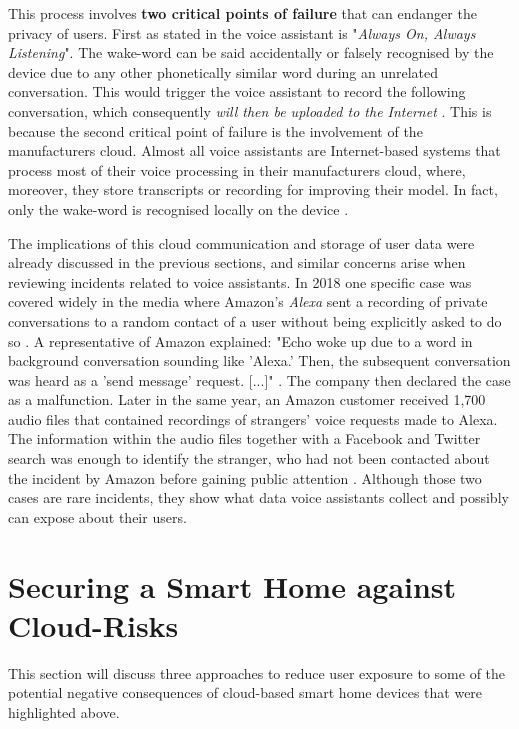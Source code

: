 This process involves \textbf{two critical points of failure} that can endanger the privacy of users. First as stated in \cite{SHPA-10.1145/3412383} the voice assistant is "\textit{Always On, Always Listening}". The wake-word can be said accidentally or falsely recognised by the device due to any other phonetically similar word during an unrelated conversation. This would trigger the voice assistant to record the following conversation, which consequently \textit{will then be uploaded to the Internet} \cite{SHPA-10.1145/3412383}. This is because the second critical point of failure is the involvement of the manufacturers cloud. Almost all voice assistants are Internet-based systems that process most of their voice processing in their manufacturers cloud, where, moreover, they store transcripts or recording for improving their model. In fact, only the wake-word is recognised locally on the device \cite{SHPA-10.1145/3412383}\cite{BertkoChris2017HSH:}.

The implications of this cloud communication and storage of user data were already discussed in the previous sections, and similar concerns arise when reviewing incidents related to voice assistants. In 2018 one specific case was covered widely in the media where Amazon's \textit{Alexa} sent a recording of private conversations to a random contact of a user without being explicitly asked to do so \cite{Horton2018AlexaRecordsConversation}. A representative of Amazon explained: "Echo woke up due to a word in background conversation sounding like 'Alexa.' Then, the subsequent conversation was heard as a 'send message' request. [...]" \cite{Horton2018AlexaRecordsConversation}. The company then declared the case as a malfunction. Later in the same year, an Amazon customer received 1,700 audio files that contained recordings of strangers' voice requests made to Alexa. The information within the audio files together with a Facebook and Twitter search was enough to identify the stranger, who had not been contacted about the incident by Amazon before gaining public attention \cite{Ingber2018AlexaAudioFiles}. Although those two cases are rare incidents, they show what data voice assistants collect and possibly can expose about their users.



\section{Securing a Smart Home against Cloud-Risks}
This section will discuss three approaches to reduce user exposure to some of the potential negative consequences of cloud-based smart home devices that were highlighted above.

